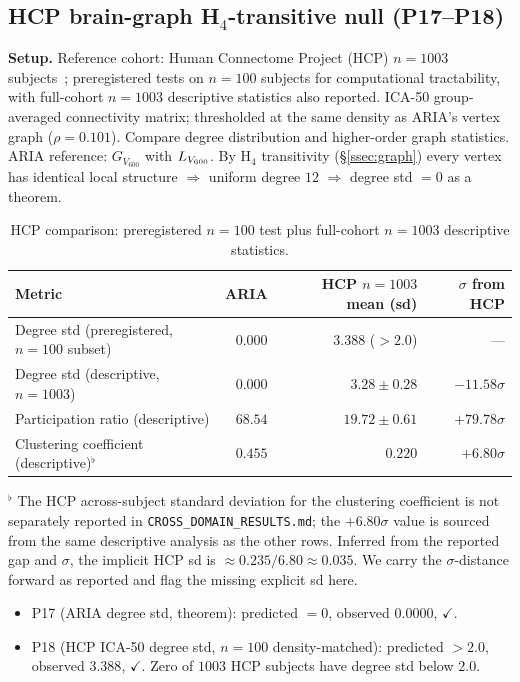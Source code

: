 \subsection{HCP brain-graph H$_4$-transitive null
            (P17--P18)}\label{ssec:hcp}

\textbf{Setup.} Reference cohort: Human Connectome Project (HCP)
$n=1003$ subjects~\citep{VanEssen2013HCP}; preregistered tests on
$n=100$ subjects for computational tractability, with full-cohort
$n=1003$ descriptive statistics also reported. ICA-50 group-averaged
connectivity matrix; thresholded at the same density as ARIA's
vertex graph ($\rho=0.101$). Compare degree distribution and
higher-order graph statistics. ARIA reference: $G_{V_{600}}$ with
$L_{V_{600}}$. By H$_4$ transitivity (\S\ref{ssec:graph}) every vertex
has identical local structure $\Rightarrow$ uniform degree $12$
$\Rightarrow$ degree std $= 0$ as a theorem.

\begin{table}[ht]
\centering
\small
\caption{HCP comparison: preregistered $n=100$ test plus full-cohort
$n=1003$ descriptive statistics.}
\label{tab:hcp}
\begin{tabular}{l r r r}
\toprule
Metric & ARIA & HCP $n=1003$ mean (sd) & $\sigma$ from HCP \\
\midrule
Degree std (preregistered, $n=100$ subset) & $0.000$ & $3.388$ ($> 2.0$) & --- \\
Degree std (descriptive, $n=1003$)         & $0.000$ & $3.28\pm 0.28$ & $-11.58\sigma$ \\
Participation ratio (descriptive)          & $68.54$ & $19.72\pm 0.61$ & $+79.78\sigma$ \\
Clustering coefficient (descriptive)$^{\flat}$ & $0.455$ & $0.220$ & $+6.80\sigma$ \\
\bottomrule
\end{tabular}
\end{table}

\noindent$^{\flat}$ The HCP across-subject standard deviation for the
clustering coefficient is not separately reported in
\texttt{CROSS\_DOMAIN\_RESULTS.md}; the $+6.80\sigma$ value is sourced
from the same descriptive analysis as the other rows. Inferred from
the reported gap and $\sigma$, the implicit HCP sd is
$\approx 0.235/6.80\!\approx\!0.035$. We carry the $\sigma$-distance
forward as reported and flag the missing explicit sd here.

\begin{itemize}\itemsep=2pt
\item P17 (ARIA degree std, theorem): predicted $=0$, observed
  $0.0000$, $\checkmark$.
\item P18 (HCP ICA-50 degree std, $n=100$ density-matched):
  predicted $> 2.0$, observed $3.388$, $\checkmark$. Zero of $1003$
  HCP subjects have degree std below $2.0$.
\end{itemize}

